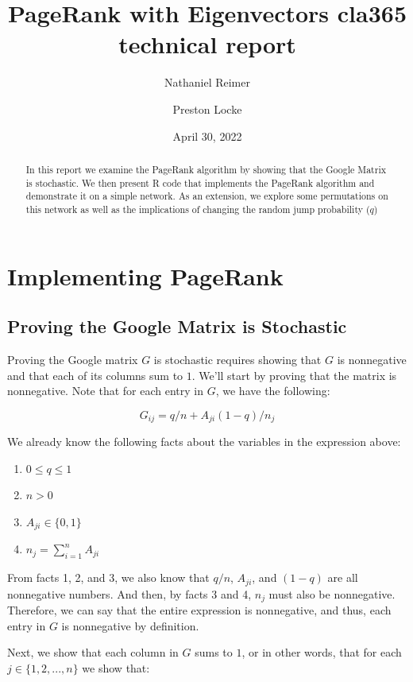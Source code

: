 \documentclass{article}
\title{{\sffamily PageRank with Eigenvectors}
{\sc cla365 technical report }}
\author{Nathaniel Reimer \and Preston Locke}
\date{April 30, 2022}
\begin{document}
\maketitle

\begin{abstract} 
\noindent
In this report we examine the PageRank algorithm by showing that the Google Matrix is stochastic. We then present R code that implements the PageRank algorithm and demonstrate it on a simple network. As an extension, we explore some permutations on this network as well as the implications of changing the random jump probability ($q$)
\end{abstract}


\section{Implementing PageRank}

\subsection{Proving the Google Matrix is Stochastic}


Proving the Google matrix $G$ is stochastic requires showing that $G$ is nonnegative
and that each of its columns sum to $1$. We'll start by proving that the matrix is
nonnegative. Note that for each entry in $G$, we have the following:

$$
G_{ij} = q/n + A_{ji} (1 - q) / n_j
$$

We already know the following facts about the variables in the expression above:

\begin{enumerate}
    \item $0 \leq q \leq 1$
    \item $n > 0$
    \item $A_{ji} \in \{0,1\}$
    \item $n_j = \sum_{i=1}^n A_{ji}$
\end{enumerate}

From facts 1, 2, and 3, we also know that $q/n$, $A_{ji}$, and $(1 - q)$ are all
nonnegative numbers. And then, by facts 3 and 4, $n_j$ must also be nonnegative. Therefore,
we can say that the entire expression is nonnegative, and thus, each entry in $G$ is
nonnegative by definition.

Next, we show that each column in $G$ sums to $1$, or in other words, that for each
$j \in \{ 1, 2, ..., n\}$ we show that:
\end{document}
